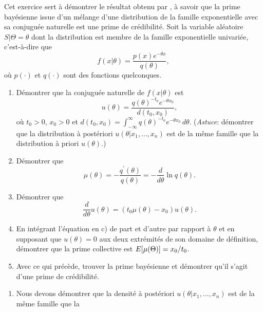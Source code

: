 \begin{exercice}
  Cet exercice sert à démontrer le résultat obtenu par
  \cite{Jewell:exact:1974}, à savoir que la prime bayésienne issue
  d'un mélange d'une distribution de la famille exponentielle avec sa
  conjuguée naturelle est une prime de crédibilité. Soit la variable
  aléatoire $S|\Theta = \theta$ dont la distribution est membre de la
  famille exponentielle univariée, c'est-à-dire que
  \begin{equation*}
    f(x|\theta) = \frac{p(x) e^{-\theta x}}{q(\theta)},
  \end{equation*}
  où $p(\cdot)$ et $q(\cdot)$ sont des fonctions quelconques.
  \begin{enumerate}
  \item Démontrer que la conjuguée naturelle de $f(x|\theta)$ est
    \begin{equation*}
      u(\theta) = \frac{q(\theta)^{-t_0} e^{-\theta x_0}}{d(t_0, x_0)},
    \end{equation*}
    où $t_0 > 0$, $x_0 > 0$ et $d(t_0, x_0) = \int_{-\infty}^\infty
    q(\theta)^{-t_0} e^{-\theta x_0}\, d\theta$.  (\emph{Astuce}:
    démontrer que la distribution à postériori $u(\theta|x_1, \dots,
    x_n)$ est de la même famille que la distribution à priori
    $u(\theta)$.)
  \item Démontrer que
    \begin{equation*}
      \mu(\theta) = - \frac{q^\prime(\theta)}{q(\theta)} =
      - \frac{d}{d\theta} \ln q(\theta).
    \end{equation*}
  \item Démontrer que
    \begin{equation*}
      \frac{d}{d\theta} u(\theta) = (t_0 \mu(\theta) - x_0) u(\theta).
    \end{equation*}
  \item En intégrant l'équation en c) de part et d'autre par rapport à
    $\theta$ et en supposant que $u(\theta) = 0$ aux deux extrémités
    de son domaine de définition, démontrer que la prime collective
    est $E [ \mu(\Theta) ] = x_0/t_0$.
  \item Avec ce qui précède, trouver la prime bayésienne et démontrer
    qu'il s'agit d'une prime de crédibilité.
  \end{enumerate}
  \begin{sol}
    \begin{enumerate}
    \item Nous devons démontrer que la densité à postériori
      $u(\theta|x_1, \dots, x_n)$ est de la même famille que la

\end{enumerate}
\end{sol}
\end{exercice}
